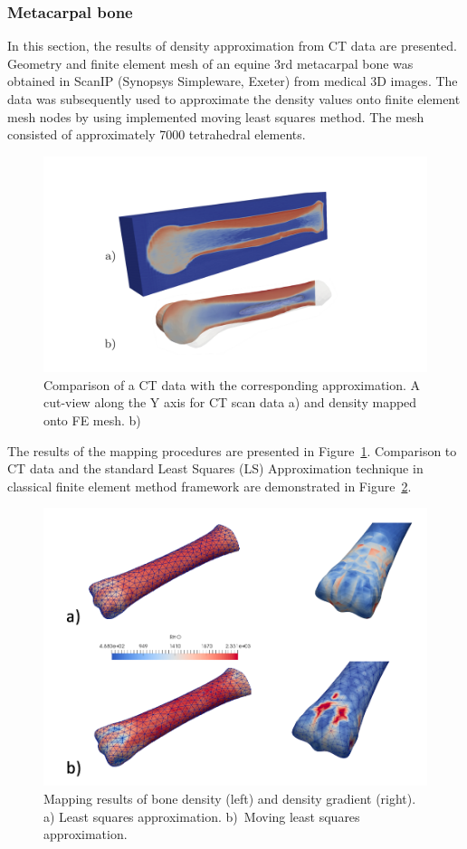 \documentclass[11pt]{acmeArticle}
\numberwithin{equation}{section}
\begin{document}
\subsubsection{Metacarpal bone}
In this section, the results of density approximation from CT data are presented. Geometry and finite element mesh of an equine 3rd metacarpal bone was obtained in ScanIP (Synopsys Simpleware, Exeter) from medical 3D images. The data was subsequently used to approximate the density values onto finite element mesh nodes by using implemented moving least squares method. The mesh consisted of approximately 7000 tetrahedral elements. \\
\begin{figure}
	\centering
	\includegraphics[width=0.5\linewidth]{Figures/mwlsmapping_cross.pdf}
	\caption{Comparison of a CT data with the corresponding approximation. A cut-view along the Y axis for CT scan data a) and density mapped onto FE mesh. b)}
	\label{fig:mwlsmapping_cross}
\end{figure}
The results of the mapping procedures are presented in Figure~\ref{fig:mwlsmapping_cross}. Comparison to CT data and the standard Least Squares (LS) Approximation technique in classical finite element method framework are demonstrated in Figure~\ref{fig:mwlsmappingcomparisons}.
\begin{figure}
	\centering
	\includegraphics[width=0.7\linewidth]{Figures/mwls_mapping_comparisons.png}
	\caption{Mapping results of bone density (left) and density gradient (right). a) Least squares approximation. b)~Moving least squares approximation.}
	\label{fig:mwlsmappingcomparisons}
\end{figure}
\end{document}
